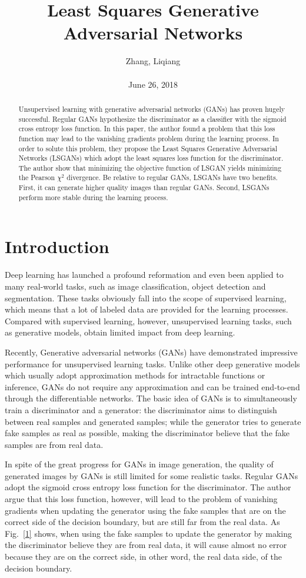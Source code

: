 \documentclass[10pt,twocolumn,letterpaper]{article}
\title{\textbf{Least Squares Generative Adversarial Networks}}
\author{Zhang, Liqiang\\\\June 26, 2018}
\begin{document}
\maketitle
\par
\begin{abstract}
  Unsupervised learning with generative adversarial networks (GANs) has proven hugely successful. Regular GANs hypothesize the discriminator as a classifier with the sigmoid cross entropy loss function. In this paper, the author found a problem that this loss function may lead to the vanishing gradients problem during the learning process. In order to solute this problem, they propose the Least Squares Generative Adversarial Networks (LSGANs) which adopt the least squares loss function for the discriminator. The author show that minimizing the objective function of LSGAN yields minimizing the Pearson $\chi^2$ divergence. Be relative to regular GANs, LSGANs have two benefits. First, it can generate higher quality images than regular GANs. Second, LSGANs perform more stable during the learning process.
\end{abstract}
\section{Introduction}
Deep learning has launched a profound reformation and even been applied to many real-world tasks, such as image classification\cite{He2016Deep}, object detection\cite{Ren2015Faster} and segmentation\cite{Shelhamer2017Fully}. These tasks obviously fall into the scope of supervised learning, which means that a lot of labeled data are provided for the learning processes. Compared with supervised learning, however, unsupervised learning tasks, such as generative models, obtain limited impact from deep learning.
\par
Recently, Generative adversarial networks (GANs)\cite{Goodfellow2014Generative} have demonstrated impressive performance for unsupervised learning tasks. Unlike other deep generative models which usually adopt approximation methods for intractable functions or inference, GANs do not require any approximation and can be trained end-to-end through the differentiable networks. The basic idea of GANs is to simultaneously train a discriminator and a generator: the discriminator aims to distinguish between real samples and generated samples; while the generator tries to generate fake samples as real as possible, making the discriminator believe that the fake samples are from real data.
\par
In spite of the great progress for GANs in image generation, the quality of generated images by GANs is still limited for some realistic tasks. Regular GANs adopt the sigmoid cross entropy loss function for the discriminator. The author argue that this loss function, however, will lead to the problem of vanishing gradients when updating the generator using the fake samples that are on the correct side of the decision boundary, but are still far from the real data. As Fig.~\ref{1} shows, when using the fake samples to update the generator by making the discriminator believe they are from real data, it will cause almost no error because they are on the correct side, in other word, the real data side, of the decision boundary.
\end{document}
